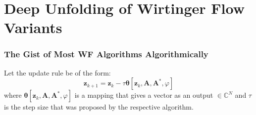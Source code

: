 \section[DU/AU of WF*]{Deep Unfolding of Wirtinger Flow Variants}
\begin{frame}
  \frametitle{The Gist of Most WF Algorithms Algorithmically}
  Let the update rule be of the form:
  \begin{equation}
    \boldsymbol{z}_{k+1} = \boldsymbol{z}_k - \tau\boldsymbol{\theta}[\boldsymbol{z}_k,\boldsymbol{A},\boldsymbol{A^*},\varphi]
  \end{equation}
  where $\boldsymbol{\theta}[\boldsymbol{z}_k,\boldsymbol{A},\boldsymbol{A^*},\varphi]$ is a mapping that gives a vector as an output 
  $\in\mathbb{C}^N$ and $\tau$ is the step size that was proposed by the respective algorithm.

  
  
\end{frame}





